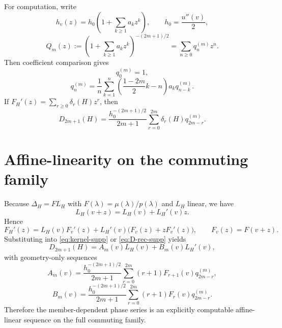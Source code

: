 \documentclass[11pt]{article}
\newcommand{\LH}{L_H}
\begin{document}
For computation, write
\begin{equation}
 h_v(z)=h_0\left(1+\sum_{k\ge1}a_kz^k\right),\qquad h_0=\frac{u''(v)}{2},
\end{equation}
\begin{equation}
 Q_m(z):=\left(1+\sum_{k\ge1}a_kz^k\right)^{-(2m+1)/2}=\sum_{n\ge0}q_n^{(m)}z^n.
\end{equation}
Then coefficient comparison gives
\begin{equation}
 q_0^{(m)}=1,
\end{equation}
\begin{equation}
 q_n^{(m)}=\frac{1}{n}\sum_{k=1}^n\left(\frac{1-2m}{2}k-n\right)a_kq_{n-k}^{(m)}.
 \label{eq:q-rec-supp}
\end{equation}
If $F_H'(z)=\sum_{r\ge0}\delta_r(H)z^r$, then
\begin{equation}
 D_{2m+1}(H)=\frac{h_0^{-(2m+1)/2}}{2m+1}\sum_{r=0}^{2m}\delta_r(H)q_{2m-r}^{(m)}.
 \label{eq:D-rec-supp}
\end{equation}

\section{Affine-linearity on the commuting family}
Because $\Delta_H=F\LH$ with $F(\lambda)=\mu(\lambda)/p(\lambda)$ and $\LH$ linear, we have
\begin{equation}
 \LH(v+z)=\LH(v)+\LH'(v)z.
\end{equation}
Hence
\begin{equation}
 F_H'(z)=\LH(v)F_v'(z)+\LH'(v)\bigl(F_v(z)+zF_v'(z)\bigr),\qquad F_v(z)=F(v+z).
\end{equation}
Substituting into \eqref{eq:kernel-supp} or \eqref{eq:D-rec-supp} yields
\begin{equation}
 D_{2m+1}(H)=A_m(v)\LH(v)+B_m(v)\LH'(v),
\end{equation}
with geometry-only sequences
\begin{equation}
 A_m(v)=\frac{h_0^{-(2m+1)/2}}{2m+1}\sum_{r=0}^{2m}(r+1)F_{r+1}(v)q_{2m-r}^{(m)},
\end{equation}
\begin{equation}
 B_m(v)=\frac{h_0^{-(2m+1)/2}}{2m+1}\sum_{r=0}^{2m}(r+1)F_r(v)q_{2m-r}^{(m)}.
\end{equation}
Therefore the member-dependent phase series is an explicitly computable affine-linear sequence on the full commuting family.
\end{document}
